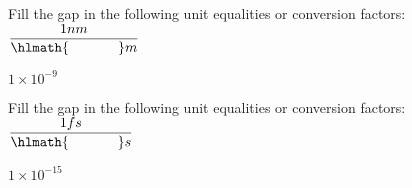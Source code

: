 \documentclass[main.tex]{subfiles}
\begin{document}
\begin{multicols*}{2}
\begin{question}[ID=\the\value{numA}]
Fill the gap in the following unit equalities or conversion factors:
$\dfrac{1nm}{\hlmath{\hspace{35pt }}m}$
\end{question}
\begin{solution}
$1\times 10^{-9}$
\hspace{0.1cm}\end{solution}%

\begin{question}[ID=\the\value{numA}]
Fill the gap in the following unit equalities or conversion factors:
$\dfrac{1fs}{\hlmath{\hspace{35pt }}s}$
\end{question}
\begin{solution}
$1\times 10^{-15}$
\hspace{0.1cm}\end{solution}%







\end{multicols*}
\end{document}
